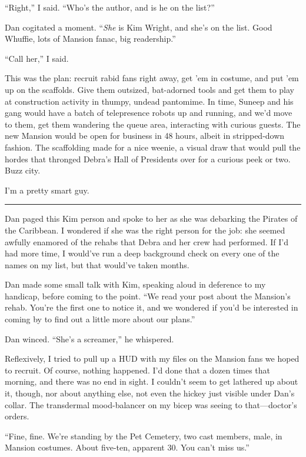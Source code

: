 “Right,” I said. “Who's the author, and is he on the list?”

Dan cogitated a moment. “\emph{She} is Kim Wright, and she's on the
list. Good Whuffie, lots of Mansion fanac, big readership.”

“Call her,” I said.

This was the plan: recruit rabid fans right away, get 'em in
costume, and put 'em up on the scaffolds. Give them outsized,
bat-adorned tools and get them to play at construction activity in
thumpy, undead pantomime. In time, Suneep and his gang would have a
batch of telepresence robots up and running, and we'd move to them,
get them wandering the queue area, interacting with curious guests.
The new Mansion would be open for business in 48 hours, albeit in
stripped-down fashion. The scaffolding made for a nice weenie, a
visual draw that would pull the hordes that thronged Debra's Hall
of Presidents over for a curious peek or two. Buzz city.

I'm a pretty smart guy.

\begin{center}\rule{3in}{0.4pt}\end{center}

Dan paged this Kim person and spoke to her as she was debarking the
Pirates of the Caribbean. I wondered if she was the right person
for the job: she seemed awfully enamored of the rehabs that Debra
and her crew had performed. If I'd had more time, I would've run a
deep background check on every one of the names on my list, but
that would've taken months.

Dan made some small talk with Kim, speaking aloud in deference to
my handicap, before coming to the point. “We read your post about
the Mansion's rehab. You're the first one to notice it, and we
wondered if you'd be interested in coming by to find out a little
more about our plans.”

Dan winced. “She's a screamer,” he whispered.

Reflexively, I tried to pull up a HUD with my files on the Mansion
fans we hoped to recruit. Of course, nothing happened. I'd done
that a dozen times that morning, and there was no end in sight. I
couldn't seem to get lathered up about it, though, nor about
anything else, not even the hickey just visible under Dan's collar.
The transdermal mood-balancer on my bicep was seeing to
that—doctor's orders.

“Fine, fine. We're standing by the Pet Cemetery, two cast members,
male, in Mansion costumes. About five-ten, apparent 30. You can't
miss us.”

